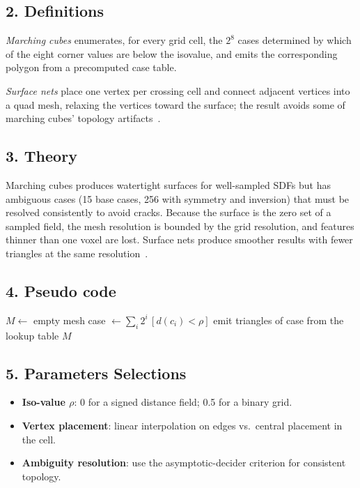 \subsection{2. Definitions}

\begin{definition}\label{def:marching_cubes_grid}
\emph{Marching cubes} enumerates, for every grid cell, the $2^8$ cases
determined by which of the eight corner values are below the isovalue, and
emits the corresponding polygon from a precomputed case table.
\end{definition}

\begin{definition}\label{def:surface_nets}
\emph{Surface nets} place one vertex per crossing cell and connect adjacent
vertices into a quad mesh, relaxing the vertices toward the surface; the
result avoids some of marching cubes' topology artifacts~\cite{gibson1998}.
\end{definition}

\subsection{3. Theory}
Marching cubes produces watertight surfaces for well-sampled SDFs but has
ambiguous cases (15 base cases, 256 with symmetry and inversion) that must be
resolved consistently to avoid cracks. Because the surface is the zero set of
a sampled field, the mesh resolution is bounded by the grid resolution, and
features thinner than one voxel are lost. Surface nets produce smoother
results with fewer triangles at the same resolution~\cite{gibson1998}.

\subsection{4. Pseudo code}
\begin{algorithmic}
    \State $M \gets$ empty mesh
        \State case $\gets \sum_i 2^i\,[d(c_i) < \rho]$
        \State emit triangles of case from the lookup table
    \EndFor
    \State \Return $M$
\EndFunction
\end{algorithmic}

\subsection{5. Parameters Selections}
\begin{itemize}
    \item \textbf{Iso-value $\rho$}: 0 for a signed distance field; 0.5 for a binary grid.
    \item \textbf{Vertex placement}: linear interpolation on edges vs.\ central placement in the cell.
    \item \textbf{Ambiguity resolution}: use the asymptotic-decider criterion for consistent topology.
\end{itemize}

